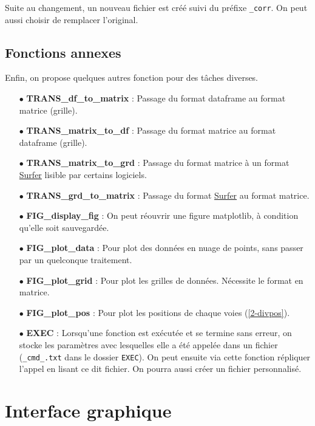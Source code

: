 \documentclass[12pt]{article}
\begin{document}
    Suite au changement, un nouveau fichier est créé suivi du préfixe \texttt{\_corr}. On peut aussi choisir de remplacer l'original.

\subsection{Fonctions annexes} \label{3-5}

    Enfin, on propose quelques autres fonction pour des tâches diverses.

    \begin{enumerate}
        \item[$\bullet$] \textbf{TRANS\_df\_to\_matrix} : Passage du format dataframe au format matrice (grille).
        \item[$\bullet$] \textbf{TRANS\_matrix\_to\_df} : Passage du format matrice au format dataframe (grille).
        \item[$\bullet$] \textbf{TRANS\_matrix\_to\_grd} : Passage du format matrice à un format \href{https://surferhelp.goldensoftware.com/gridmisc/grid_files.htm}{Surfer} lisible par certains logiciels.
        \item[$\bullet$] \textbf{TRANS\_grd\_to\_matrix} : Passage du format \href{https://surferhelp.goldensoftware.com/gridmisc/grid_files.htm}{Surfer} au format matrice.
        \item[$\bullet$] \textbf{FIG\_display\_fig} : On peut réouvrir une figure matplotlib, à condition qu'elle soit sauvegardée.
        \item[$\bullet$] \textbf{FIG\_plot\_data} : Pour plot des données en nuage de points, sans passer par un quelconque traitement.
        \item[$\bullet$] \textbf{FIG\_plot\_grid} : Pour plot les grilles de données. Nécessite le format en matrice.
        \item[$\bullet$] \textbf{FIG\_plot\_pos} : Pour plot les positions de chaque voies (\ref{2-divpos}).
        \item[$\bullet$] \textbf{EXEC} : Lorsqu'une fonction est exécutée et se termine sans erreur, on stocke les paramètres avec lesquelles elle a été appelée dans un fichier (\texttt{\_cmd\_.txt} dans le dossier \texttt{EXEC}). On peut ensuite via cette fonction répliquer l'appel en lisant ce dit fichier. On pourra aussi créer un fichier personnalisé.
    \end{enumerate}

\newpage
\section{Interface graphique}
\end{document}
